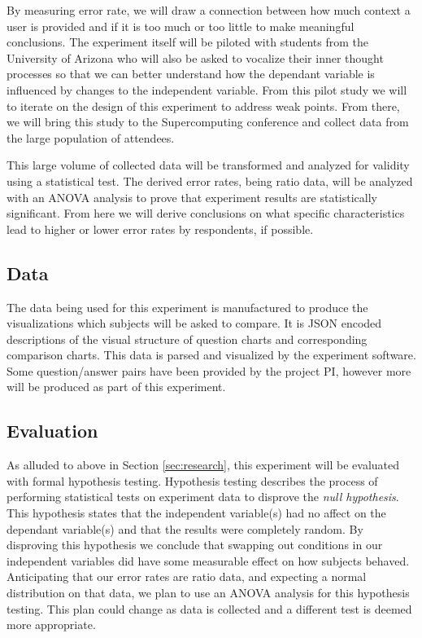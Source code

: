 By measuring error rate, we will draw a connection between how much context a user is provided and if it is too much or too little to make meaningful conclusions. The experiment itself will be piloted with students from the University of Arizona who will also be asked to vocalize their inner thought processes so that we can better understand how the dependant variable is influenced by changes to the independent variable. From this pilot study we will to iterate on the design of this experiment to address weak points. From there, we will bring this study to the Supercomputing conference and collect data from the large population of attendees.

This large volume of collected data will be transformed and analyzed for validity using a statistical test. The derived error rates, being ratio data, will be analyzed with an ANOVA analysis to prove that experiment results are statistically significant. From here we will derive conclusions on what specific characteristics lead to higher or lower error rates by respondents, if possible.


\subsection{Data}
\label{sec:data}

The data being used for this experiment is manufactured to produce the visualizations which subjects will be asked to compare. It is JSON encoded descriptions of the visual structure of question charts and corresponding comparison charts. This data is parsed and visualized by the experiment software. Some question/answer pairs have been provided by the project PI, however more will be produced as part of this experiment. 

\subsection{Evaluation}
\label{sec:eval}
As alluded to above in Section \ref{sec:research}, this experiment will be evaluated with formal hypothesis testing. Hypothesis testing describes the process of performing statistical tests on experiment data to disprove the \textit{null hypothesis}. This hypothesis states that the independent variable(s) had no affect on the dependant variable(s) and that the results were completely random. By disproving this hypothesis we conclude that swapping out conditions in our independent variables did have some measurable effect on how subjects behaved. Anticipating that our error rates are ratio data, and expecting a normal distribution on that data, we plan to use an ANOVA analysis for this hypothesis testing. This plan could change as data is collected and a different test is deemed more appropriate. 

